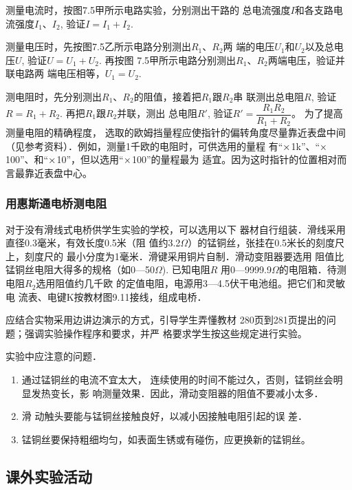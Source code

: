 测量电流时，按图7.5甲所示电路实验，分别测出干路的
总电流强度$I$和各支路电流强度$I_1$、$I_2$, 验证$I=I_1+I_2$.

\begin{figure}[htp]
    \centering
    \caption{}
\end{figure}

测量电压时，先按图7.5乙所示电路分别测出$R_1$、$R_2$两
端的电压$U_1$和$U_2$以及总电压$U$, 验证$U=U_1+U_2$. 再按图
7.5甲所示电路分别测出$R_1$、$R_2$两端电压，验证并联电路两
端电压相等，$U_1=U_2$.

测电阻时，先分别测出$R_1$、$R_2$的阻值，接着把$R_1$跟$R_2$串
联测出总电阻$R$, 验证$R=R_1+R_2$. 再把$R_1$跟$R_2$并联，测出
总电阻$R'$, 验证$R'=\dfrac{R_1R_2}{R_1+R_2}$。
为了提高测量电阻的精确程度，
选取的欧姆挡量程应使指针的偏转角度尽量靠近表盘中间
（见参考资料）．例如，测量1千欧的电阻时，可供选用的量程
有“$\times$1k”、“$\times$100”、和“$\times$10”，但以选用“$\times$100”的量程最为
适宜。因为这时指针的位置相对而言最靠近表盘中心。

\subsubsection{用惠斯通电桥测电阻}
对于没有滑线式电桥供学生实验的学校，可以选用以下
器材自行组装．滑线采用直径0.3毫米，有效长度0.5米（阻
值约3.2$\Omega$）的锰铜丝，张挂在0.5米长的刻度尺上，刻度尺的
最小分度为1毫米．滑键采用铜片自制．滑动变阻器要选用
阻值比锰铜丝电阻大得多的规格（如0—50$\Omega$). 已知电阻$R$
用0—9999.9$\Omega$的电阻箱．待测电阻$R_2$选用阻值约几千欧
的定值电阻，电源用3—4.5伏干电池组。把它们和灵敏电
流表、电键K按教材图9.11接线，组成电桥．

应结合实物采用边讲边演示的方式，引导学生弄懂教材
280页到281页提出的问题；强调实验操作程序和要求，并严
格要求学生按这些规定进行实验。

实验中应注意的问题．
\begin{enumerate}
\item 通过锰铜丝的电流不宜太大，
连续使用的时间不能过久，否则，锰铜丝会明显发热变长，影
响测量效果．因此，滑动变阻器的阻值不要减小太多．    
\item 滑
动触头要能与锰铜丝接触良好，以减小因接触电阻引起的误
差．    
\item 锰铜丝要保持粗细均匀，如表面生锈或有碰伤，应更换新的锰铜丝。
\end{enumerate}

\subsection{课外实验活动}
